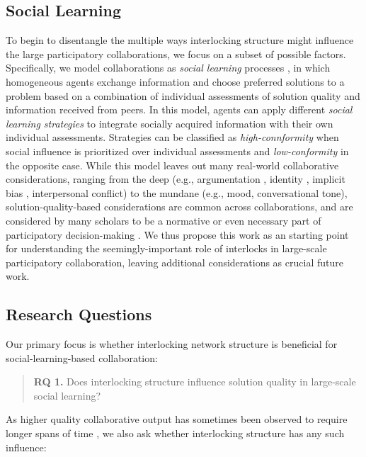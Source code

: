 \documentclass[manuscript,screen,review,acmsmall]{acmart}
\begin{document}
\subsection{Social Learning}
To begin to disentangle the multiple ways interlocking structure might influence the large participatory collaborations,
we focus on a subset of possible factors.
Specifically, we model collaborations as {\em social learning} processes \cite{barkoczi_social_2016, mason_collaborative_2012, hong_interpreted_2009, degroot_reaching_1974},
in which homogeneous agents exchange information and choose preferred solutions to a problem based on a combination of individual assessments of solution quality and information received from peers.
In this model, agents can apply different
{\em social learning strategies} to integrate socially acquired information with their own individual assessments.
Strategies can be classified as {\em high-connformity} when social influence is prioritized over individual assessments and {\em low-conformity} in the opposite case.
While this model leaves out many real-world collaborative considerations,
ranging from the deep
(e.g.,
argumentation \cite{fishkin_voice_1997, mansbridge_minimalist_2015},
identity \cite{bail_breaking_2022,schkade_what_2007},
implicit bias \cite{amodio_stereotyping_2006},
interpersonal conflict\cite{whiting_did_2019})
to the mundane (e.g.,
mood, 
conversational tone),
solution-quality-based considerations are common across collaborations,
and are considered by many scholars to be a normative or even necessary
part of participatory decision-making
\cite{mansbridge_minimalist_2015}.
We thus propose this work as an starting point for understanding the seemingly-important role of interlocks in large-scale participatory collaboration, leaving additional considerations as crucial future work.

\subsection{Research Questions}
Our primary focus is whether interlocking network structure is beneficial for social-learning-based collaboration:
\begin{quote}
{\bfseries RQ 1.} Does interlocking structure influence solution quality in large-scale social learning?
\end{quote}

As higher quality collaborative output has sometimes been observed to require longer spans of time
\cite{
gentry_consensus_1982,
platt_network_2018},
we also ask whether interlocking structure
has any such influence:
\end{document}
